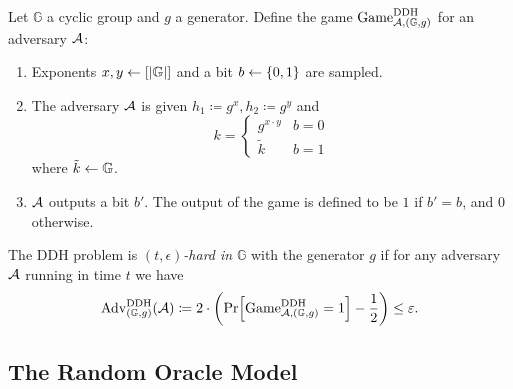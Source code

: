 \begin{definition}
	Let $\mathbb{G}$ a cyclic group and $g$ a generator. Define the game $\mathrm{Game}_{\mathcal{A}, (\mathbb{G}, g)}^{\mathrm{DDH}}$ for an adversary $\mathcal{A}$:
	\begin{enumerate}[1.]
		\item Exponents $x, y \leftarrow [\lvert\mathbb{G}\rvert]$ and a bit $b \leftarrow \{0, 1\}$ are sampled.
		\item The adversary $\mathcal{A}$ is given $h_1 \coloneqq g^x, h_2 \coloneqq g^y$ and
		      \[
			      k = \begin{cases}
				      g^{x \cdot y} & b = 0 \\
				      \tilde{k}     & b = 1
			      \end{cases}
		      \]
		      where $\tilde{k} \leftarrow \mathbb{G}$.
		\item $\mathcal{A}$ outputs a bit $b'$. The output of the game is defined to be $1$ if $b' = b$, and $0$ otherwise.
	\end{enumerate}
\end{definition}

\begin{definition}
	The DDH problem is \emph{$(t, \epsilon)$-hard in} $\mathbb{G}$ with the generator $g$ if for any adversary $\mathcal{A}$ running in time $t$ we have
	\begin{align*}
		\mathrm{Adv}_{(\mathbb{G}, g)}^{\mathrm{DDH}}(\adv) \coloneqq 2 \cdot \left(\pr{\mathrm{Game}_{\adv, (\mathbb{G}, g)}^{\mathrm{DDH}} = 1} - \frac{1}{2}\right) \le \epsilon.
	\end{align*}
\end{definition}


\subsection{The Random Oracle Model}

